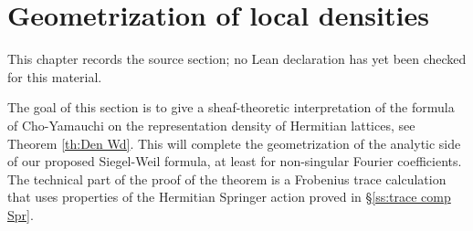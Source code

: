 \chapter{Geometrization of local densities}
\label{higher-siegel-weil-unitary-nonsingular-terms-chapter-05}

\begin{remark}
\label{higher-siegel-weil-unitary-nonsingular-terms-chapter-05-source}
This chapter records the source section; no Lean declaration has yet been checked for this material.
\notready
\end{remark}

\label{s:geom density}
The goal of this section is to give a sheaf-theoretic interpretation of the formula of Cho-Yamauchi on the representation density of Hermitian lattices, see Theorem \ref{th:Den Wd}. This will complete the geometrization of the analytic side of our proposed Siegel-Weil formula, at least for non-singular Fourier coefficients. The technical part of the proof of the theorem is a Frobenius trace calculation that uses properties of the Hermitian Springer action proved in \S\ref{ss:trace comp Spr}.


